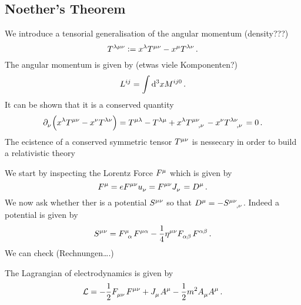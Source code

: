 \subsection{Noether's Theorem}
We introduce a tensorial generalisation of the angular momentum (density???)
\begin{equation}
\tensor{T}{^\lambda^\mu^\nu}:=
\tensor{x}{^\lambda}\tensor{T}{^\mu^\nu}-\tensor{x}{^\mu}\tensor{T}{^\lambda^\nu}\,
.
\end{equation}
The angular momentum is given by (etwas viele Komponenten?)
\begin{equation}
\tensor{L}{^i^j} = \int\dif{}^3 x \tensor{M}{^i^j^0}\, .
\end{equation}
It can be shown that it is a conserved quantity
\begin{equation}
\tensor{\partial}{_\nu}\left(\tensor{x}{^\lambda}\tensor{T}{^\mu^\nu}-\tensor{x}{^\nu}\tensor{T}{^\lambda^\nu}\right)
=\tensor{T}{^\mu^\lambda}-\tensor{T}{^\lambda^\mu}+\tensor{x}{^\lambda}
\tensor{T}{^\mu^\nu_,_\nu}-\tensor{x}{^\nu}\tensor{T}{^\lambda^\nu_,_\nu}=0\, .
\end{equation}
The ecistence of a conserved symmetric tensor $\tensor{T}{^\mu^\nu}$ is
nessecary in order to build a relativistic theory
\begin{example}[Electrodynamics]
We start by inspecting the Lorentz Force $\tensor{F}{^\mu}$ which is given by
\begin{equation}
\tensor{F}{^\mu}=e\tensor{F}{^\mu^\nu}\tensor{u}{_\nu}=\tensor{F}{^\mu^\nu}\tensor{J}{_\nu}=\tensor{D}{^\mu}\,
.
\end{equation}
We now ask whether ther is a potential $\tensor{S}{^\mu^\nu}$ so that
$\tensor{D}{^\mu}=-\tensor{S}{^\mu^\nu_{,\nu}}$. Indeed a potential is given by 
\begin{equation}
\tensor{S}{^\mu^\nu}=\tensor{F}{^\mu_\alpha}\tensor{F}{^\mu^\alpha}-\frac{1}{4}\tensor{\eta}{^\mu^\nu}\tensor{F}{_\alpha_\beta}\tensor{F}{^\alpha^\beta}\,
.
\end{equation}
We can check 
(Rechnungen\ldots.)

The Lagrangian of electrodynamics is given by
\begin{equation}
\mathcal{L}=-\frac{1}{2}\tensor{F}{_\mu_\nu}\tensor{F}{^\mu^\nu}+\tensor{J}{_\mu}\tensor{A}{^\mu}-\frac{1}{2}m^2\tensor{A}{_\mu}\tensor{A}{^\mu}\,
.
\end{equation}
\end{example}

